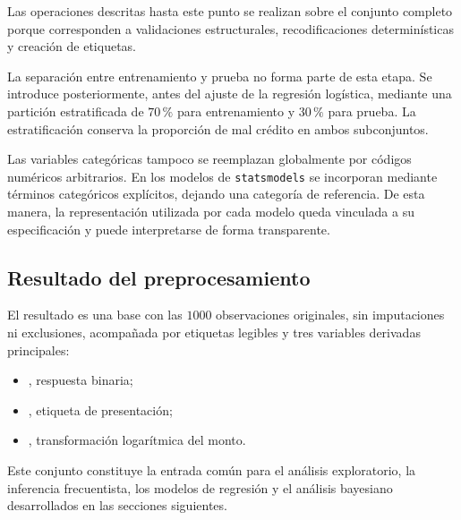 Las operaciones descritas hasta este punto se realizan sobre el conjunto
completo porque corresponden a validaciones estructurales, recodificaciones
determinísticas y creación de etiquetas.

La separación entre entrenamiento y prueba no forma parte de esta etapa.
Se introduce posteriormente, antes del ajuste de la regresión logística,
mediante una partición estratificada de \(70\,\%\) para entrenamiento y
\(30\,\%\) para prueba. La estratificación conserva la proporción de mal
crédito en ambos subconjuntos.

Las variables categóricas tampoco se reemplazan globalmente por códigos
numéricos arbitrarios. En los modelos de \texttt{statsmodels} se
incorporan mediante términos categóricos explícitos, dejando una
categoría de referencia. De esta manera, la representación utilizada por
cada modelo queda vinculada a su especificación y puede interpretarse de
forma transparente.

\subsection{Resultado del preprocesamiento}

El resultado es una base con las \(1000\) observaciones originales, sin
imputaciones ni exclusiones, acompañada por etiquetas legibles y tres
variables derivadas principales:

\begin{itemize}
    \item {}, respuesta binaria;
    \item {}, etiqueta de presentación;
    \item {}, transformación logarítmica del monto.
\end{itemize}

Este conjunto constituye la entrada común para el análisis exploratorio,
la inferencia frecuentista, los modelos de regresión y el análisis
bayesiano desarrollados en las secciones siguientes.


